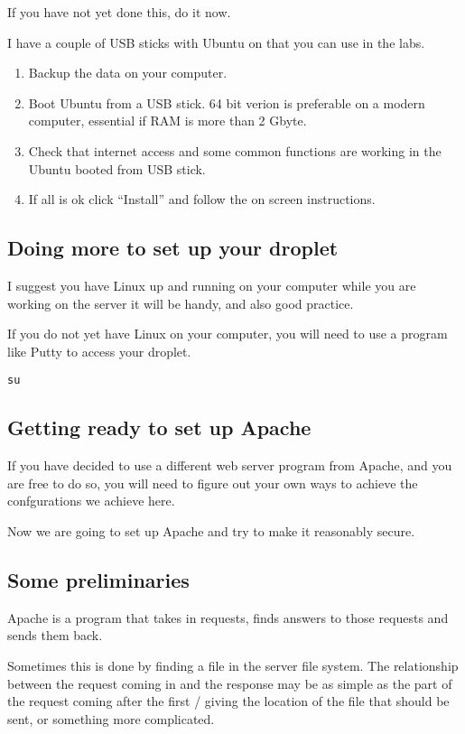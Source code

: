 \documentclass[12pt, a4paper]{article}
\begin{document}
If you have not yet done this, do it now. 

I have a couple of USB sticks with Ubuntu on that you can use in the labs.


\begin{enumerate}
 \item Backup the data on your computer.
 \item Boot Ubuntu from a USB stick. 64 bit verion is preferable on a modern computer, 
  essential if RAM is more than 2 Gbyte.
 \item Check that internet access and some common functions are working in the Ubuntu booted from USB stick.
 \item If all is ok click ``Install'' and follow the on screen instructions.
\end{enumerate}

\subsection*{Doing more to set up your droplet}


I suggest you have Linux up and running on your computer while you are working on the server  it will be handy, and also good practice.

If you do not yet have Linux on your computer, you will need to use a program like Putty to access your droplet.
\begin{verbatim}
su
\end{verbatim}


\subsection*{Getting ready to set up Apache}

If you have decided to use a different web server program from Apache, and you are free to do so, you will need to figure out your own ways to achieve the confgurations we achieve here.

Now we are going to set up Apache and try to make it reasonably secure.

\subsection*{Some preliminaries}
Apache is a program that takes in requests, finds answers to those requests and sends them back.

Sometimes this is done by finding a file in the server file system. The relationship between the request coming in and the response may be as simple as the part of the request coming after the first / giving the location of the file that should be sent, or something more complicated.
\end{document}
